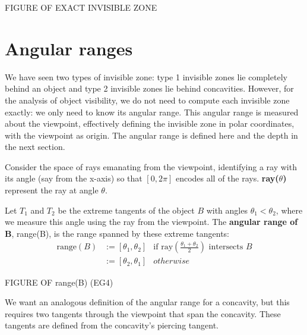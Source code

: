 \documentclass[12pt]{article}
\begin{document}
FIGURE OF EXACT INVISIBLE ZONE 


\section{Angular ranges}

We have seen two types of invisible zone: type 1 invisible zones lie completely
behind an object and type 2 invisible zones lie behind concavities.
However, for the analysis of object visibility,
we do not need to compute each invisible zone exactly:
we only need to know its angular range.
This angular range is measured about the viewpoint,
effectively defining the invisible zone in polar coordinates, 
with the viewpoint as origin.
The angular range is defined here and the depth in the next section.



\begin{defn2}
Consider the space of rays emanating from the viewpoint, identifying
a ray with its angle (say from the x-axis) so that $[0,2\pi]$ encodes
all of the rays.
{\bf ray($\theta$)} represent the ray at angle $\theta$.
\end{defn2}
\begin{defn2} 
Let $T_1$ and $T_2$ be the extreme tangents of the object $B$
with angles $\theta_1 < \theta_2$,
where we measure this angle using the ray from the viewpoint.
The {\bf angular range of B}, range(B), is the range
spanned by these extreme tangents:
\begin{eqnarray*}
\mbox{range}(B) & :=[\theta_1,\theta_2] & \mbox{if ray} 
(\frac{\theta_1 + \theta_2}{2})
\mbox{ intersects } B \\
              & := [\theta_2, \theta_1] & otherwise
\end{eqnarray*}
\end{defn2}

FIGURE OF range(B) (EG4)

We want an analogous definition of the angular range for a concavity,
but this requires two tangents through the viewpoint that span the concavity.
These tangents are defined from the concavity's piercing tangent.
\end{document}
